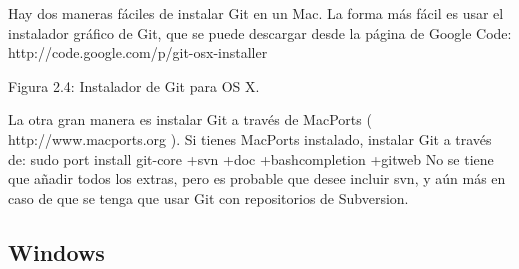 \documentclass[12pt, spanish, oneside, onecolumn, a4paper]{report}
\begin{document}
 
Hay dos maneras fáciles de instalar Git en un Mac. La forma más fácil es usar el instalador gráfico de Git, que se puede descargar desde la página de Google Code:
http://code.google.com/p/git-osx-installer

Figura 2.4: Instalador de Git para OS X.


La otra gran manera es instalar Git a través de MacPorts ( http://www.macports.org ). Si tienes MacPorts instalado, instalar Git a través de:
 sudo port install git-core +svn +doc +bashcompletion +gitweb
No se tiene que añadir todos los extras, pero es probable que desee incluir svn, y aún más en caso de que se tenga que usar Git con repositorios de Subversion.

\subsection{Windows}
\label{sec:installwindows}
\end{document}
